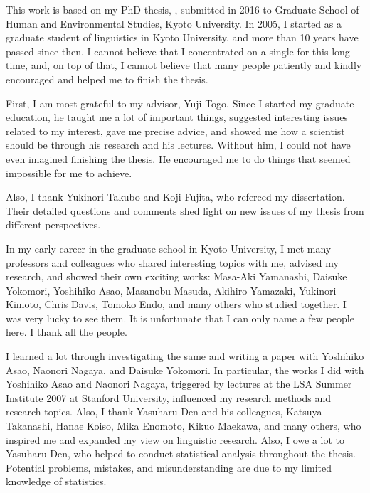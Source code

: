 \begin{refsection}

This work is based on my PhD thesis,
,
submitted in 2016 to Graduate School of Human and Environmental Studies, Kyoto University.
In 2005, I started as a graduate student of linguistics in Kyoto University, and more than 10 years have passed since then.
I cannot believe that I concentrated on a single  for this long time,
and, on top of that,
I cannot believe that many people patiently and kindly
encouraged and helped me to finish the thesis.

First, I am most grateful to my advisor, Yuji Togo.
Since I started my graduate education,
he taught me a lot of important things,
suggested interesting issues related to my interest,
gave me precise advice, and
showed me how a scientist should be through his research and his lectures.
Without him,
I could not have even imagined finishing the thesis.
He encouraged me to do things that seemed impossible for me to achieve.

Also, I thank Yukinori Takubo and Koji Fujita,
who refereed my dissertation.
Their detailed questions and comments shed light on new issues of my thesis
from different perspectives.

In my early career in the graduate school in Kyoto University,
I met many professors and colleagues who shared interesting topics with me, advised my research, and showed their own exciting works:
Masa-Aki Yamanashi, Daisuke Yokomori, Yoshihiko Asao, Masanobu Masuda, Akihiro Yamazaki, Yukinori Kimoto, Chris Davis, Tomoko Endo, and many others who studied together.
I was very lucky to see them.
It is unfortunate that I can only name a few people here.
I thank all the people.

I learned a lot through investigating the same  and writing a paper with Yoshihiko Asao, Naonori Nagaya, and Daisuke Yokomori.
In particular, the works I did with Yoshihiko Asao and Naonori Nagaya,
triggered by lectures at the LSA Summer Institute 2007 at Stanford University,
influenced my research methods and research topics.
Also, I thank Yasuharu Den and his colleagues, Katsuya Takanashi, Hanae Koiso, Mika Enomoto, Kikuo Maekawa, and many others,
who inspired me and expanded my view on linguistic research.
Also, I owe a lot to Yasuharu Den, who helped to conduct statistical analysis
throughout the thesis.
Potential problems, mistakes, and misunderstanding are due to my limited knowledge of statistics.


\end{refsection}
